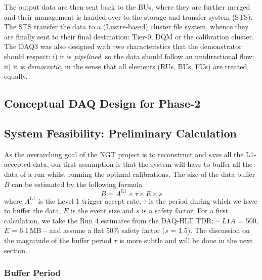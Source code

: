 The output data are then sent back to the BUs, where they are further merged and their management is handed over to the storage and transfer system (STS).
The STS  transfer the data to a (Lustre-based) cluster file system, whence they are finally sent to their final destination:
Tier-0,
DQM
or the calibration cluster.
The DAQ3 was also designed with two characteristics that the demonstrator should respect: 
i) it is \emph{pipelined}, so the data should follow an unidirectional flow;
ii) it is \emph{democratic}, in the sense that all elements (RUs, BUs, FUs) are treated equally.


\subsection{Conceptual DAQ Design for Phase-2}

\subsection{System Feasibility: Preliminary Calculation}

As the overarching goal of the NGT project is to reconstruct and save all the L1-accepted data, 
our first assumption is that the system will have to buffer all the data of a run whilst 
running the optimal calibrations.
The size of the data buffer $B$ can be estimated by the following formula
\begin{equation}
B = A^{\text{L1}} \times \tau \times E \times s
\label{eq:buffersize}
\end{equation}
where $A^{\text{L1}}$ is the Level-1 trigger accept rate,
$\tau$ is the period during which we have to buffer the data,
$E$ is the event size and
$s$ is a safety factor.
For a first calculation, we take the Run 4 estimates from the DAQ-HLT TDR:
-- $L1A$ = 500\kHz, $E$ = 6.1\,MB --
and assume a flat 50\% safety factor ($s$ = 1.5).
The discussion on the magnitude of the buffer period $\tau$ is more subtle and will be done in the next section.

\subsubsection{Buffer Period}

